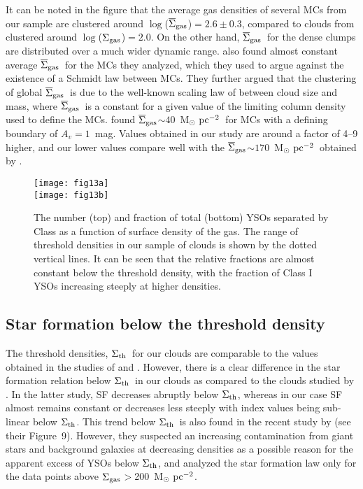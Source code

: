 \documentclass[iop]{emulateapj}
\newcommand{\msunpc}{M$_{\odot}~{\rm pc}^{-2}$}
\newcommand{\siggas}{$\Sigma_{\rm gas}$}
\newcommand{\siggasav}{$\overline\Sigma_{\rm gas}$}
\newcommand{\sigth}{$\Sigma_{\rm th}$}
\begin{document}
It can be noted in the figure that the average gas densities of several MCs from 
our sample  are clustered around $\log$(\siggasav)$=2.6\pm0.3$, compared to 
clouds from \citet{heiderman+10} clustered around $\log$(\siggas)$=2.0$. 
On the other hand, \siggasav\ for the dense clumps 
are distributed over a much wider dynamic range. \citet{lada+13} also
found almost constant average \siggasav\ for the MCs they analyzed, which 
they used to argue against the existence of a Schmidt law between MCs. 
They further argued that the clustering of global \siggasav\ is due to 
the well-known scaling law of \citet{larson+81} between cloud size and mass, 
where \siggasav\ is a constant for a given value of the limiting column density 
used to define the MCs. \citet{heyer+09} found \siggasav$\sim40$~\msunpc\ 
for MCs with a defining boundary of $A_v=1$~mag. 
Values obtained in our study are around a factor of 4--9 higher, 
and our lower values compare well with the \siggasav$\sim170$~\msunpc\  obtained 
by \citet{solomon+87}.


\begin{figure}[ht!]
     \begin{center}
            \texttt{[image: fig13a]} \\
            \texttt{[image: fig13b]}
    \end{center}
\caption{
The number (top) and fraction of total (bottom) YSOs separated
by Class as a function of surface density of the gas. 
The range of threshold densities in our sample of clouds is
shown by the dotted vertical lines. It can be seen that the
relative fractions are almost constant below the threshold density,
with the fraction of Class I YSOs increasing steeply at higher
densities.
}
\label{figure13}
\end{figure}

\subsection{Star formation below the threshold density}


The threshold densities, \sigth\ for our clouds are comparable to the values 
obtained in the studies of \cite{heiderman+10} and \cite{lada+12}. However, 
there is a clear difference in the star formation relation below \sigth\ in 
our clouds as compared to the clouds studied by \citet{heiderman+10}. 
In the latter study, SF decreases abruptly below \sigth,
whereas in our case SF almost remains constant or decreases less steeply with index values
being sub-linear below \sigth. 
This trend below \sigth\ is also found in the recent study by \citet{willis+15}
(see their Figure~9). However, they suspected an increasing contamination from giant 
stars and background galaxies at decreasing densities  as a possible reason for the
apparent excess of YSOs below \sigth, and analyzed the star formation law only for the 
data points above \siggas$>$200~\msunpc. 
\end{document}
